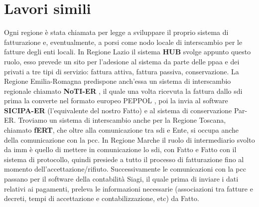 \chapter{Lavori simili}

Ogni regione è stata chiamata per legge a sviluppare il proprio sistema di fatturazione e, eventualmente, a porsi come nodo locale di interscambio per le fatture degli enti locali.
In Regione Lazio il sistema \textbf{HUB} \cite{hub} svolge appunto questo ruolo, esso prevede un sito per l'adesione al sistema da parte delle \Gls{ppaa} e dei privati a tre tipi di servizio: fattura attiva, fattura passiva, conservazione.
La Regione Emilia-Romagna predispone anch'essa un sistema di interscambio regionale chiamato \textbf{NoTI-ER} \cite{notier}, il quale una volta ricevuta la fattura dallo \Gls{sdi} prima la converte nel formato europeo PEPPOL \cite{peppol}, poi la invia al software \textbf{SICIPA-ER} (l'equivalente del nostro Fatto) e al sistema di conservazione Par-ER.
Troviamo un sistema di interscambio anche per la Regione Toscana, chiamato \textbf{fERT}, che oltre alla comunicazione tra \Gls{sdi} e Ente, si occupa anche della comunicazione con la \Gls{pcc}.
In Regione Marche il ruolo di intermediario svolto da \Gls{imm} \cite{intermedia} è quello di mettere in comunicazione lo \Gls{sdi}, con Fatto e Fatto con il sistema di protocollo, quindi presiede a tutto il processo di fatturazione fino al momento dell'accettazione/rifiuto.
Successivamente le comunicazioni con la \Gls{pcc} passano per il software della contabilità Siagi, il quale prima di inviare i dati relativi ai pagamenti, preleva le informazioni necessarie (associazioni tra fatture e decreti, tempi di accettazione e contabilizzazione, etc) da Fatto.





